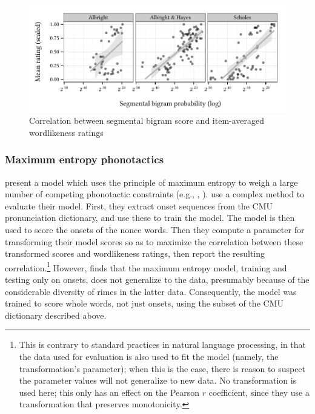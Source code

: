 \begin{figure}[ht]
\centering
\includegraphics{bigram.pdf}
\caption{Correlation between segmental bigram score and item-averaged wordlikeness ratings}
\label{bigram}
\end{figure}

\subsubsection{Maximum entropy phonotactics}

\citet{Hayes2008a} present a model which uses the principle of maximum entropy to weigh a large number of competing phonotactic constraints (e.g., \citealt{Goldwater2003}, \citealt{Jager2007}). 
\citeauthor{Hayes2008a} use a complex method to evaluate their model. First, they extract onset sequences from the CMU pronunciation dictionary, and use these to train the model. The model is then used to score the onsets of the \citet{Scholes1966} nonce words. Then they compute a parameter for transforming their model scores so as to maximize the correlation between these transformed scores and wordlikeness ratings, then report the resulting correlation.\footnote{This is contrary to standard practices in natural language processing, in that the data used for evaluation is also used to fit the model (namely, the transformation's parameter); when this is the case, there is reason to suspect the parameter values will not generalize to new data.
No transformation is used here; this only has an effect on the Pearson $r$ coefficient, since they use a transformation that preserves monotonicity.}
However, \citet{Albright2009a} finds that the maximum entropy model, training and testing only on onsets, does not generalize to the \citet{Albright2003b} data, presumably because of the considerable diversity of rimes in the latter data. 
Consequently, the model was trained to score whole words, not just onsets, using the subset of the CMU dictionary described above. 

